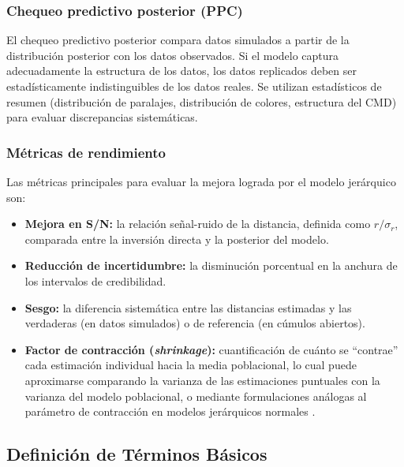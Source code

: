 \documentclass[stu, 12pt, letterpaper, donotrepeattitle, floatsintext, natbib]{apa7_ula}
\begin{document}
\subsubsection{Chequeo predictivo posterior (PPC)}
El chequeo predictivo posterior \citep[cap.~6]{Gelman_BDA3} compara
datos simulados a partir de la distribución posterior con los datos observados. Si el modelo captura
adecuadamente la estructura de los datos, los datos replicados
deben ser estadísticamente indistinguibles de los datos reales.
Se utilizan estadísticos de resumen (distribución de paralajes,
distribución de colores, estructura del CMD) para evaluar
discrepancias sistemáticas.


\subsubsection{Métricas de rendimiento}
Las métricas principales para evaluar la mejora lograda por el
modelo jerárquico son:
\begin{itemize}
    \item \textbf{Mejora en S/N:} la relación señal-ruido de la
    distancia, definida como $r / \sigma_r$, comparada entre la
    inversión directa y la posterior del modelo.
    \item \textbf{Reducción de incertidumbre:} la disminución
    porcentual en la anchura de los intervalos de credibilidad.
    \item \textbf{Sesgo:} la diferencia sistemática entre las
    distancias estimadas y las verdaderas (en datos simulados) o
    de referencia (en cúmulos abiertos).
    \item \textbf{Factor de contracción (\textit{shrinkage}):}
    cuantificación de cuánto se ``contrae'' cada estimación
    individual hacia la media poblacional, lo cual puede aproximarse comparando
    la varianza de las estimaciones puntuales con la varianza del modelo poblacional,
    o mediante formulaciones análogas al parámetro de contracción en modelos
    jerárquicos normales \citep[cap.~5]{Gelman_BDA3}.
\end{itemize}

\subsection{Definición de Términos Básicos}
\end{document}
